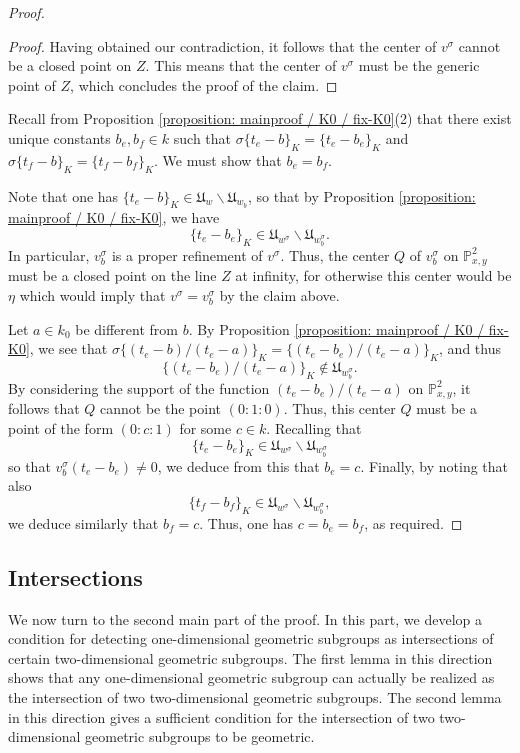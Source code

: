 \documentclass[11pt]{amsart}
\theoremstyle{definition}
\theoremstyle{remark}
\numberwithin{equation}{section}
\newcommand{\Pbb}{\mathbb{P}}
\newcommand{\Ufrak}{\mathfrak{U}}
\begin{document}
\begin{proof}
\begin{proof}
    Having obtained our contradiction, it follows that the center of $v^\sigma$ cannot be a closed point on $Z$.
    This means that the center of $v^\sigma$ must be the generic point of $Z$, which concludes the proof of the claim.
  \end{proof}

  Recall from Proposition \ref{proposition: mainproof / K0 / fix-K0}(2) that there exist unique constants $b_e,b_f \in k$ such that $\sigma\{t_e-b\}_K = \{t_e-b_e\}_K$ and $\sigma\{t_f-b\}_K = \{t_f-b_f\}_K$.
  We must show that $b_e = b_f$.

  Note that one has $\{t_e-b\}_K \in \Ufrak_w \smallsetminus \Ufrak_{w_b}$, so that by Proposition \ref{proposition: mainproof / K0 / fix-K0}, we have
  \[ \{t_e-b_e\}_K \in \Ufrak_{w^\sigma} \smallsetminus \Ufrak_{w_b^\sigma}. \]
  In particular, $v_b^\sigma$ is a proper refinement of $v^\sigma$.
  Thus, the center $Q$ of $v_b^\sigma$ on $\Pbb^2_{x,y}$ must be a closed point on the line $Z$ at infinity, for otherwise this center would be $\eta$ which would imply that $v^\sigma = v^\sigma_b$ by the claim above.

  Let $a \in k_0$ be different from $b$.
  By Proposition \ref{proposition: mainproof / K0 / fix-K0}, we see that $\sigma\{(t_e-b)/(t_e-a)\}_K = \{(t_e-b_e)/(t_e-a)\}_K$, and thus
  \[ \{(t_e-b_e)/(t_e-a)\}_K \notin \Ufrak_{w_b^\sigma}. \]
  By considering the support of the function $(t_e-b_e)/(t_e-a)$ on $\Pbb^2_{x,y}$, it follows that $Q$ cannot be the point $(0:1:0)$.
  Thus, this center $Q$ must be a point of the form $(0:c:1)$ for some $c \in k$.
  Recalling that
  \[ \{t_e-b_e\}_K \in \Ufrak_{w^\sigma} \smallsetminus \Ufrak_{w_b^\sigma}\]
  so that $v_b^\sigma(t_e-b_e) \neq 0$, we deduce from this that $b_e = c$.
  Finally, by noting that also
  \[ \{t_f-b_f\}_K \in \Ufrak_{w^\sigma} \smallsetminus \Ufrak_{w_b^\sigma}, \]
  we deduce similarly that $b_f = c$.
  Thus, one has $c = b_e = b_f$, as required.
\end{proof}

\subsection{Intersections}
\label{subsection: mainproof / intersections}

We now turn to the second main part of the proof.
In this part, we develop a condition for detecting one-dimensional geometric subgroups as intersections of certain two-dimensional geometric subgroups.
The first lemma in this direction shows that any one-dimensional geometric subgroup can actually be realized as the intersection of two two-dimensional geometric subgroups.
The second lemma in this direction gives a sufficient condition for the intersection of two two-dimensional geometric subgroups to be geometric.
\end{document}
